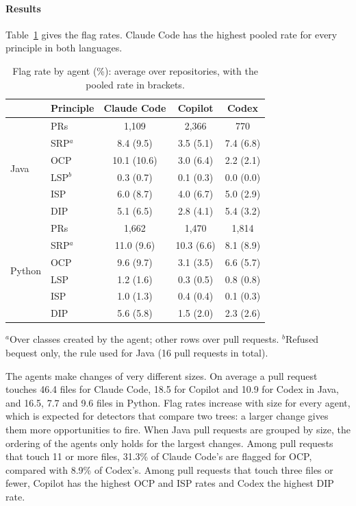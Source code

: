 \documentclass[sigconf]{acmart}
\begin{document}
\paragraph{Results} Table~\ref{tab:rates} gives the flag rates. Claude Code has the highest pooled
rate for every principle in both languages.

\begin{table}[t]
\caption{Flag rate by agent (\%): average over repositories, with the pooled rate in brackets.}
\label{tab:rates}
\footnotesize
\setlength{\tabcolsep}{3.2pt}
\begin{tabular}{@{}llccc@{}}
\toprule
 & \textbf{Principle} & \textbf{Claude Code} & \textbf{Copilot} & \textbf{Codex} \\
\midrule
\multirow{6}{*}{Java}
 & PRs & 1,109 & 2,366 & 770 \\
 & SRP$^a$ & 8.4 (9.5)   & 3.5 (5.1) & 7.4 (6.8) \\
 & OCP & 10.1 (10.6) & 3.0 (6.4) & 2.2 (2.1) \\
 & LSP$^b$ & 0.3 (0.7) & 0.1 (0.3) & 0.0 (0.0) \\
 & ISP & 6.0 (8.7)   & 4.0 (6.7) & 5.0 (2.9) \\
 & DIP & 5.1 (6.5)   & 2.8 (4.1) & 5.4 (3.2) \\
\midrule
\multirow{6}{*}{Python}
 & PRs & 1,662 & 1,470 & 1,814 \\
 & SRP$^a$ & 11.0 (9.6) & 10.3 (6.6) & 8.1 (8.9) \\
 & OCP & 9.6 (9.7)   & 3.1 (3.5) & 6.6 (5.7) \\
 & LSP & 1.2 (1.6)   & 0.3 (0.5) & 0.8 (0.8) \\
 & ISP & 1.0 (1.3)   & 0.4 (0.4) & 0.1 (0.3) \\
 & DIP & 5.6 (5.8)   & 1.5 (2.0) & 2.3 (2.6) \\
\bottomrule
\end{tabular}

\vspace{3pt}
\raggedright\scriptsize $^a$Over classes created by the agent; other rows over pull requests.
$^b$Refused bequest only, the rule used for Java (16 pull requests in total).
\end{table}

The agents make changes of very different sizes. On average a pull request touches 46.4 files for
Claude Code, 18.5 for Copilot and 10.9 for Codex in Java, and 16.5, 7.7 and 9.6 files in Python. Flag
rates increase with size for every agent, which is expected for detectors that compare two trees: a
larger change gives them more opportunities to fire. When Java pull requests are grouped by size, the
ordering of the agents only holds for the largest changes. Among pull requests that touch 11 or more
files, 31.3\% of Claude Code's are flagged for OCP, compared with 8.9\% of Codex's. Among pull
requests that touch three files or fewer, Copilot has the highest OCP and ISP rates and Codex the
highest DIP rate.
\end{document}
